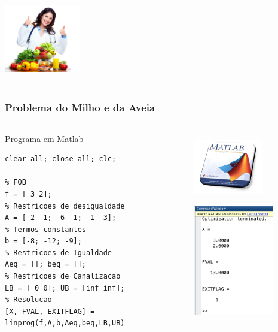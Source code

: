 \documentclass{beamer}
\begin{document}
\begin{frame}
\begin{columns}
\begin{column}{0.4\textwidth}
			\only<11>
			{
				\centering
				\includegraphics[width=3.3cm,height=3.3cm]{nutricionista.jpg}
			}
		\end{column}
	\end{columns}
\end{frame}

\begin{frame}[fragile] 
	\frametitle{Problema do Milho e da Aveia}
	\centering
	\begin{columns}
		\begin{column}{0.7\textwidth}
			\begin{block}{Programa em Matlab}
				\begin{lstlisting}
clear all; close all; clc;

% FOB
f = [ 3 2];
% Restricoes de desigualdade
A = [-2 -1; -6 -1; -1 -3];
% Termos constantes 
b = [-8; -12; -9];
% Restricoes de Igualdade
Aeq = []; beq = [];
% Restricoes de Canalizacao
LB = [ 0 0]; UB = [inf inf];
% Resolucao
[X, FVAL, EXITFLAG] = linprog(f,A,b,Aeq,beq,LB,UB)	
				\end{lstlisting}	
			\end{block}
		\end{column}
		\begin{column}{0.3\textwidth}
			\begin{figure}
				{
					\includegraphics[width=3cm,height=3cm]{solver_matlab.png}
				}
				\only<2>
				{
					\includegraphics[width=3.5cm,height=5cm]{Nutri_Matlab.png}
				}
			\end{figure}
		\end{column}				
	\end{columns}
\end{frame}
\end{document}
